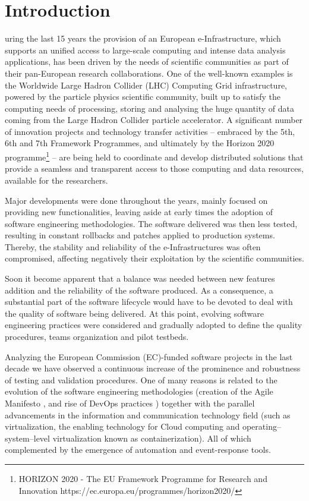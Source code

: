 \documentclass[journal]{IEEEtran}
\begin{document}
\IEEEpeerreviewmaketitle

\section{Introduction}

uring the last 15 years the provision of an European e-Infrastructure,
which supports an unified access to large-scale computing and intense data analysis
applications, has been driven by the needs of scientific communities as part of their
pan-European research collaborations. One of the well-known examples is the Worldwide 
Large Hadron Collider (LHC) Computing Grid infrastructure, powered 
by the particle physics scientific community, built up to satisfy the computing needs
of processing, storing and analysing the huge quantity of data coming from the Large 
Hadron Collider particle accelerator. A significant number of innovation projects and
technology transfer activities -- embraced by the 5th, 6th and 7th Framework Programmes,
and ultimately by the Horizon 2020 programme\footnote{HORIZON 2020 - The EU Framework
Programme for Research and Innovation https://ec.europa.eu/programmes/horizon2020/} -- are being held to coordinate and 
develop distributed solutions that provide a seamless and transparent access to those
computing and data resources, available for the researchers.

Major developments were done throughout the years, mainly focused on providing new
functionalities, leaving aside at early times the adoption of software engineering methodologies.
The software delivered was then less tested, resulting in constant
rollbacks and patches applied to production systems. Thereby, the stability and
reliability of the e-Infrastructures was often compromised, affecting
negatively their exploitation by the scientific communities.

Soon it become apparent that a balance was needed between new features addition
and the reliability of the software produced. As a consequence, a substantial part of the
software lifecycle would have to be devoted to deal with the quality of software being
delivered. At this point, evolving software engineering practices were
considered and gradually adopted to define the quality procedures, teams
organization and pilot testbeds.

Analyzing the European Commission (EC)-funded software projects in the last decade
we have observed a continuous increase of the prominence and robustness of
testing and validation procedures. One of many reasons is related to the
evolution of the software engineering methodologies (creation of the Agile
Manifesto \cite{agile-manifesto}, and rise of DevOps practices \cite{zhu}) together
with the parallel advancements in the information and communication technology
field (such as virtualization, the enabling technology for Cloud computing and 
operating--system--level virtualization known as containerization). All of which
complemented by the emergence of automation and event-response tools.
\end{document}
